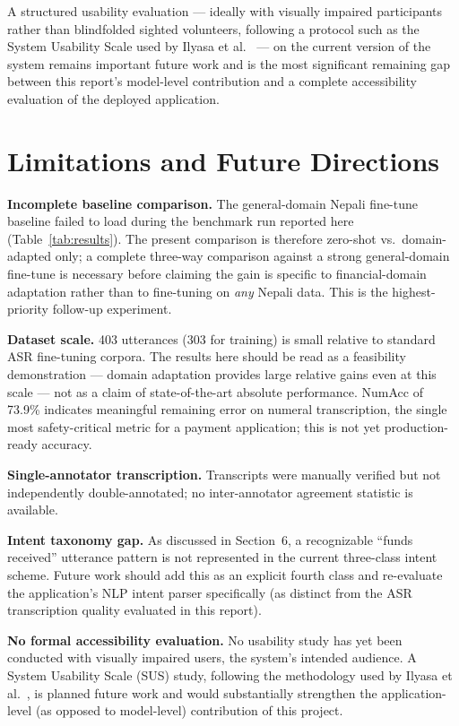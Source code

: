 \documentclass[11pt,a4paper]{article}
\begin{document}
A structured usability evaluation --- ideally with visually impaired
participants rather than blindfolded sighted volunteers, following a
protocol such as the System Usability Scale used by Ilyasa et
al.~\cite{ilyasa2023} --- on the current version of the system remains
important future work and is the most significant remaining gap
between this report's model-level contribution and a complete
accessibility evaluation of the deployed application.

\section{Limitations and Future Directions}

\textbf{Incomplete baseline comparison.} The general-domain Nepali
fine-tune baseline failed to load during the benchmark run reported here
(Table~\ref{tab:results}). The present comparison is therefore zero-shot
vs.\ domain-adapted only; a complete three-way comparison against a strong
general-domain fine-tune is necessary before claiming the gain is specific
to financial-domain adaptation rather than to fine-tuning on \textit{any}
Nepali data. This is the highest-priority follow-up experiment.

\textbf{Dataset scale.} 403 utterances (303 for training) is small relative
to standard ASR fine-tuning corpora. The results here should be read as a
feasibility demonstration --- domain adaptation provides large relative
gains even at this scale --- not as a claim of state-of-the-art absolute
performance. NumAcc of 73.9\% indicates meaningful remaining error on
numeral transcription, the single most safety-critical metric for a
payment application; this is not yet production-ready accuracy.

\textbf{Single-annotator transcription.} Transcripts were manually
verified but not independently double-annotated; no inter-annotator
agreement statistic is available.

\textbf{Intent taxonomy gap.} As discussed in Section~6, a recognizable
``funds received'' utterance pattern is not represented in the current
three-class intent scheme. Future work should add this as an explicit
fourth class and re-evaluate the application's NLP intent parser
specifically (as distinct from the ASR transcription quality evaluated in
this report).

\textbf{No formal accessibility evaluation.} No usability study has yet
been conducted with visually impaired users, the system's intended
audience. A System Usability Scale (SUS) study, following the methodology
used by Ilyasa et al.~\cite{ilyasa2023}, is planned future work and would
substantially strengthen the application-level (as opposed to model-level)
contribution of this project.
\end{document}
